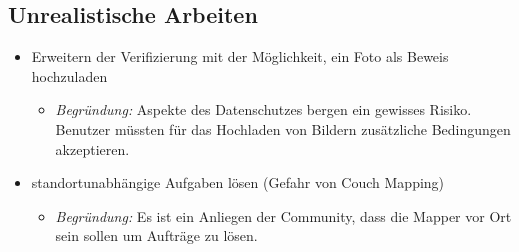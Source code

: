 \subsection{Unrealistische Arbeiten}
\begin{itemize}
	\item Erweitern der Verifizierung mit der Möglichkeit, ein Foto als Beweis hochzuladen
	\begin{itemize}
	  \item \emph{Begründung:} Aspekte des Datenschutzes bergen ein gewisses Risiko. Benutzer müssten für das Hochladen von Bildern zusätzliche Bedingungen akzeptieren.
	\end{itemize}
	\item standortunabhängige Aufgaben lösen (Gefahr von Couch Mapping)
	\begin{itemize}
	  \item \emph{Begründung:} Es ist ein Anliegen der  Community, dass die Mapper vor Ort sein sollen um Aufträge zu lösen. 
	\end{itemize}
\end{itemize}
